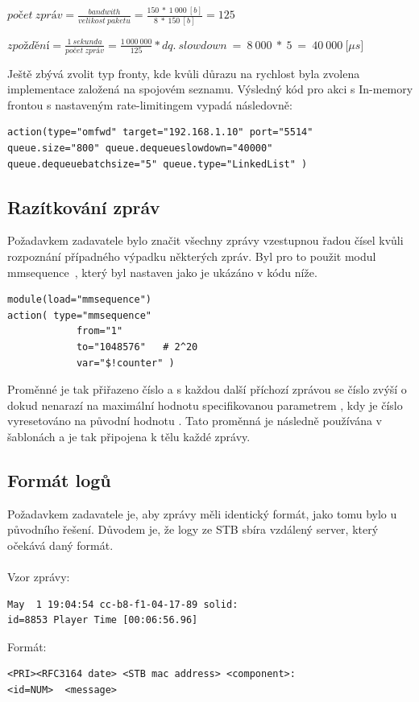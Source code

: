 \documentclass[thesis=B,czech]{FITthesis}[2012/06/26]
\begin{document}
\begin{description}
  \item $počet~zpráv=\frac{bandwith}{velikost~paketu}=\frac{150~*~1~000~[b]}{8~*~150~[b]}=125$
  \item $zpoždění=\frac{1~sekunda}{počet~zpráv}=\frac{1~000~000}{125}*dq.~slowdown~=~8~000~*~5~=~40~000~[\mu$$s]$
\end{description}
Ještě zbývá zvolit typ fronty, kde kvůli důrazu na rychlost byla zvolena implementace založená na spojovém seznamu.
Výsledný kód pro akci s In-memory frontou s nastaveným rate-limitingem vypadá následovně:
\begin{lstlisting}
action(type="omfwd" target="192.168.1.10" port="5514"
queue.size="800" queue.dequeueslowdown="40000"
queue.dequeuebatchsize="5" queue.type="LinkedList" )
\end{lstlisting}


\subsection{Razítkování zpráv}
Požadavkem zadavatele bylo značit všechny zprávy vzestupnou řadou čísel kvůli rozpoznání případného výpadku některých zpráv.
Byl pro to použit modul mmsequence~\cite{RsyslogMmsequence}, který byl nastaven jako je ukázáno v kódu níže.
\begin{lstlisting}
module(load="mmsequence")
action(	type="mmsequence"
            from="1"
            to="1048576"   # 2^20
            var="$!counter" )
\end{lstlisting}
Proměnné  je tak přiřazeno číslo  a s každou další příchozí zprávou se číslo zvýší o  dokud nenarazí na maximální hodnotu specifikovanou parametrem , kdy je číslo vyresetováno na původní hodnotu .
Tato proměnná je následně používána v šablonách a je tak připojena k tělu každé zprávy.

\subsection{Formát logů}
Požadavkem zadavatele je, aby zprávy měli identický formát, jako tomu bylo u původního řešení. Důvodem je, že logy ze STB sbíra vzdálený server, který očekává daný formát.
\\
\\
Vzor zprávy:
\begin{lstlisting}
May  1 19:04:54 cc-b8-f1-04-17-89 solid:
id=8853 Player Time [00:06:56.96]
\end{lstlisting}
Formát:
\begin{lstlisting}
<PRI><RFC3164 date> <STB mac address> <component>:
<id=NUM>  <message>
\end{lstlisting}
\end{document}
